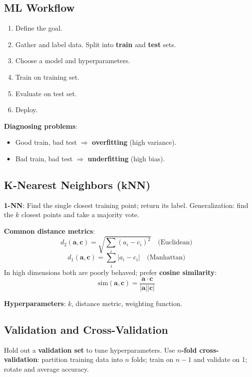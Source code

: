 \documentclass[11pt]{article}
\begin{document}
\subsection{ML Workflow}
\begin{enumerate}
  \item Define the goal.
  \item Gather and label data. Split into \textbf{train} and \textbf{test} sets.
  \item Choose a model and hyperparameters.
  \item Train on training set.
  \item Evaluate on test set.
  \item Deploy.
\end{enumerate}

\textbf{Diagnosing problems}:
\begin{itemize}
  \item Good train, bad test $\Rightarrow$ \textbf{overfitting} (high variance).
  \item Bad train, bad test $\Rightarrow$ \textbf{underfitting} (high bias).
\end{itemize}

\subsection{K-Nearest Neighbors (kNN)}
\textbf{1-NN}: Find the single closest training point; return its label. Generalization: find the $k$ closest points and take a majority vote.

\textbf{Common distance metrics}:
\[
  d_2(\mathbf{a}, \mathbf{c}) = \sqrt{\sum_i (a_i - c_i)^2} \quad \text{(Euclidean)}
\]
\[
  d_1(\mathbf{a}, \mathbf{c}) = \sum_i |a_i - c_i| \quad \text{(Manhattan)}
\]
In high dimensions both are poorly behaved; prefer \textbf{cosine similarity}:
\[
  \text{sim}(\mathbf{a}, \mathbf{c}) = \frac{\mathbf{a} \cdot \mathbf{c}}{|\mathbf{a}||\mathbf{c}|}
\]

\textbf{Hyperparameters}: $k$, distance metric, weighting function.

\subsection{Validation and Cross-Validation}
Hold out a \textbf{validation set} to tune hyperparameters. Use \textbf{$n$-fold cross-validation}: partition training data into $n$ folds; train on $n-1$ and validate on 1; rotate and average accuracy.
\end{document}
